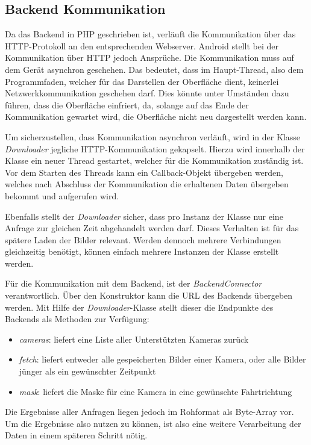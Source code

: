 \subsection{Backend Kommunikation}
\label{sec:BackendCom}
Da das Backend in PHP geschrieben ist, verläuft die Kommunikation über das HTTP-Protokoll an den entsprechenden Webserver.
Android stellt bei der Kommunikation über HTTP jedoch Ansprüche. Die Kommunikation muss auf dem Gerät asynchron geschehen. Das bedeutet, dass im Haupt-Thread,
also dem Programmfaden, welcher für das Darstellen der Oberfläche dient, keinerlei Netzwerkkommunikation geschehen darf. Dies könnte unter Umständen dazu führen, dass die Oberfläche einfriert, da, solange auf das Ende der Kommunikation gewartet wird, die Oberfläche nicht neu dargestellt werden kann.

Um sicherzustellen, dass Kommunikation asynchron verläuft, wird in der Klasse {\em Downloader} jegliche HTTP-Kommunikation gekapselt.
Hierzu wird innerhalb der Klasse ein neuer Thread gestartet, welcher für die Kommunikation zuständig ist. Vor dem Starten des Threads kann ein Callback-Objekt übergeben werden, welches nach Abschluss der Kommunikation die erhaltenen Daten übergeben bekommt und aufgerufen wird.

Ebenfalls stellt der {\em Downloader} sicher, dass pro Instanz der Klasse nur eine Anfrage zur gleichen Zeit abgehandelt werden darf. Dieses Verhalten ist für das spätere Laden der Bilder relevant.
Werden dennoch mehrere Verbindungen gleichzeitig benötigt, können einfach mehrere Instanzen der Klasse erstellt werden.

Für die Kommunikation mit dem Backend, ist der {\em BackendConnector} verantwortlich.
Über den Konstruktor kann die URL des Backends übergeben werden.
Mit Hilfe der {\em Downloader}-Klasse stellt dieser die Endpunkte des Backends als Methoden zur Verfügung:

\begin{itemize}
\item{{\em cameras}: liefert eine Liste aller Unterstützten Kameras zurück}
\item{{\em fetch}: liefert entweder alle gespeicherten Bilder einer Kamera, oder alle Bilder jünger als ein gewünschter Zeitpunkt}
\item{{\em mask}: liefert die Maske für eine Kamera in eine gewünschte Fahrtrichtung}
\end{itemize}

Die Ergebnisse aller Anfragen liegen jedoch im Rohformat als Byte-Array vor. Um die Ergebnisse also nutzen zu können, ist also eine weitere Verarbeitung der Daten in einem späteren Schritt nötig.

